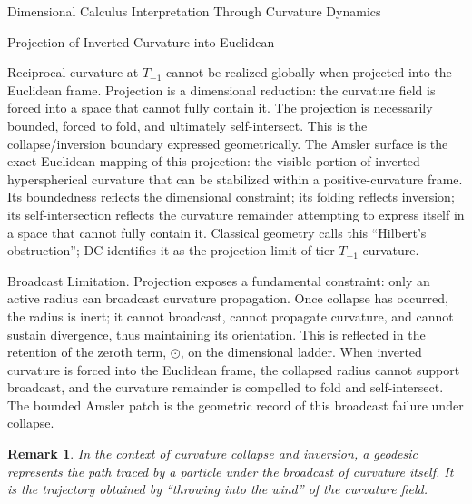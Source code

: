 \documentclass[final,onefignum,onetabnum]{siamart}
\newtheorem{remark}{Remark}
\begin{document}
\begin{section}{Dimensional Calculus Interpretation Through Curvature Dynamics}
\begin{subsection}{Projection of Inverted Curvature into Euclidean}

Reciprocal curvature at $T_{-1}$ cannot be realized globally when projected into the Euclidean frame. Projection is a dimensional reduction: the curvature field is forced into a space that cannot fully contain it. The projection is necessarily bounded, forced to fold, and ultimately self-intersect. This is the collapse/inversion boundary expressed geometrically. The Amsler surface is the exact Euclidean mapping of this projection: the visible portion of inverted hyperspherical curvature that can be stabilized within a positive-curvature frame. Its boundedness reflects the dimensional constraint; its folding reflects inversion; its self-intersection reflects the curvature remainder attempting to express itself in a space that cannot fully contain it. Classical geometry calls this “Hilbert’s obstruction”; DC identifies it as the projection limit of tier $T_{-1}$ curvature.

Broadcast Limitation. Projection exposes a fundamental constraint: only an active radius can broadcast curvature propagation. Once collapse has occurred, the radius is inert; it cannot broadcast, cannot propagate curvature, and cannot sustain divergence, thus maintaining its orientation. This is reflected in the retention of the zeroth term, $\odot$, on the dimensional ladder. When inverted curvature is forced into the Euclidean frame, the collapsed radius cannot support broadcast, and the curvature remainder is compelled to fold and self-intersect. The bounded Amsler patch is the geometric record of this broadcast failure under collapse.

\begin{remark}
In the context of curvature collapse and inversion, a geodesic represents the path traced by a particle under the broadcast of curvature itself. It is the trajectory obtained by “throwing into the wind” of the curvature field.
\end{remark}
\end{subsection}
\end{section}
\end{document}
